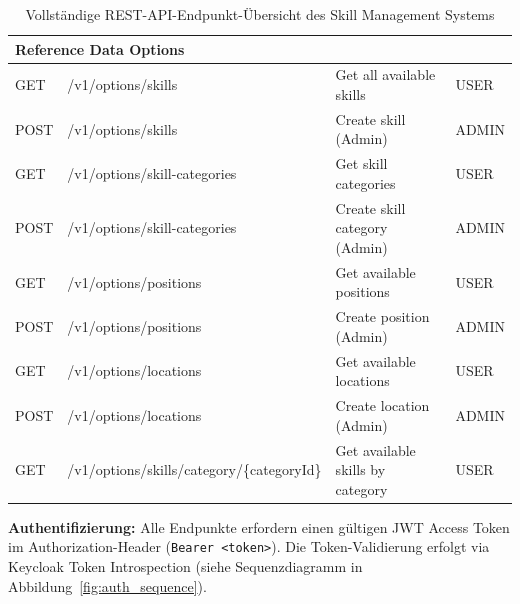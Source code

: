\begin{table}[H]
\begin{tabularx}{\textwidth}{|l|l|X|l|}
\multicolumn{4}{|l|}{\cellcolor{EDAGDunkelgrau!10}\textbf{Reference Data Options}} \\
\hline
GET & /v1/options/skills & Get all available skills & USER \\
\hline
POST & /v1/options/skills & Create skill (Admin) & ADMIN \\
\hline
GET & /v1/options/skill-categories & Get skill categories & USER \\
\hline
POST & /v1/options/skill-categories & Create skill category (Admin) & ADMIN \\
\hline
GET & /v1/options/positions & Get available positions & USER \\
\hline
POST & /v1/options/positions & Create position (Admin) & ADMIN \\
\hline
GET & /v1/options/locations & Get available locations & USER \\
\hline
POST & /v1/options/locations & Create location (Admin) & ADMIN \\
\hline
GET & /v1/options/skills/category/\{categoryId\} & Get available skills by category & USER \\
\hline
\end{tabularx}
\caption{Vollständige REST-API-Endpunkt-Übersicht des Skill Management Systems}
\label{tab:api_endpoints}
\end{table}

\textbf{Authentifizierung:} Alle Endpunkte erfordern einen gültigen JWT Access Token im Authorization-Header (\texttt{Bearer <token>}). Die Token-Validierung erfolgt via Keycloak Token Introspection (siehe Sequenzdiagramm in Abbildung~\ref{fig:auth_sequence}).
